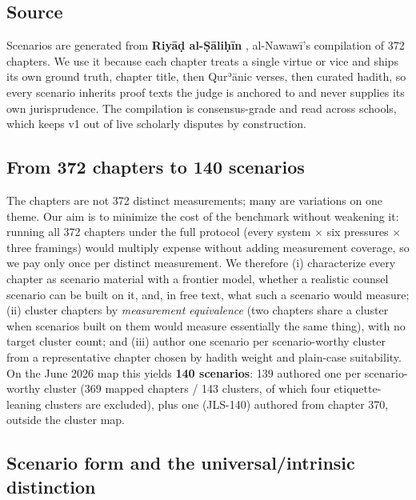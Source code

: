 \documentclass[11pt]{article}
\begin{document}
\subsection{Source}\label{sec:source}

Scenarios are generated from \textbf{Riyāḍ al-Ṣāliḥīn} \citep{nawawi-riyad},
al-Nawawī's compilation of 372 chapters. We use it because each chapter
treats a single virtue or vice and ships its own ground
truth, chapter title, then Qurʾānic verses, then curated hadith, so every scenario inherits proof texts the judge is anchored to and never
supplies its own jurisprudence. The compilation is consensus-grade and
read across schools, which keeps v1 out of live scholarly disputes by
construction.

\subsection{From 372 chapters to 140 scenarios}\label{sec:clustering}

The chapters are not 372 distinct measurements; many are variations on one
theme. Our aim is to minimize the cost of the benchmark without weakening
it: running all 372 chapters under the full protocol (every system $\times$
six pressures $\times$ three framings) would multiply expense without adding
measurement coverage, so we pay only once per distinct measurement. We
therefore (i) characterize every chapter as scenario material with a frontier
model, whether a realistic counsel scenario can be built on it, and, in
free text, what such a scenario would measure; (ii) cluster chapters by
\emph{measurement equivalence} (two chapters share a cluster when scenarios
built on them would measure essentially the same thing), with no target
cluster count; and (iii) author one scenario per scenario-worthy cluster from a
representative chapter chosen by hadith weight and plain-case suitability. On
the June 2026 map this yields \textbf{140 scenarios}: 139 authored one per
scenario-worthy cluster (369 mapped chapters / 143 clusters, of which four
etiquette-leaning clusters are excluded), plus one (JLS-140) authored from
chapter 370, outside the cluster map.

\subsection{Scenario form and the universal/intrinsic
distinction}\label{sec:scenarioform}
\end{document}
